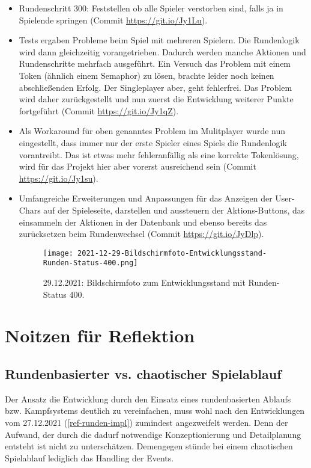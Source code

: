 \begin{itemize}
    \item Rundenschritt 300: Feststellen ob alle Spieler verstorben sind, falls ja in Spielende springen (Commit \url{https://git.io/Jy1Lu}).
    \item Tests ergaben Probleme beim Spiel mit mehreren Spielern. Die Rundenlogik wird dann gleichzeitig vorangetrieben. Dadurch werden manche Aktionen und Rundenschritte mehrfach ausgeführt. Ein Versuch das Problem mit einem Token (ähnlich einem Semaphor) zu lösen, brachte leider noch keinen abschließenden Erfolg. Der Singleplayer aber, geht fehlerfrei. Das Problem wird daher zurückgestellt und nun zuerst die Entwicklung weiterer Punkte fortgeführt (Commit \url{https://git.io/Jy1qZ}).
    \item Als Workaround für oben genanntes Problem im Mulitplayer wurde nun eingestellt, dass immer nur der erste Spieler eines Spiels die Rundenlogik vorantreibt. Das ist etwas mehr fehleranfällig als eine korrekte Tokenlösung, wird für das Projekt hier aber vorerst ausreichend sein (Commit \url{https://git.io/Jy1su}).
    \item Umfangreiche Erweiterungen und Anpassungen für das Anzeigen der User-Chars auf der Spieleseite, darstellen und aussteuern der Aktions-Buttons, das einsammeln der Aktionen in der Datenbank und ebenso bereits das zurücksetzen beim Rundenwechsel (Commit \url{https://git.io/JyDlp}).

    \begin{figure}[H]
        \centering
        \caption[]{29.12.2021: Bildschirmfoto zum Entwicklungsstand mit Runden-Status 400.}
        \label{fig:2021-12-29-Bildschirmfoto-Entwicklungsstand-Runden-Status-400.png}
        \texttt{[image: 2021-12-29-Bildschirmfoto-Entwicklungsstand-Runden-Status-400.png]}
    \end{figure}

\end{itemize}


\section{Noitzen für Reflektion}

\subsection{Rundenbasierter vs. chaotischer Spielablauf}

Der Ansatz die Entwicklung durch den Einsatz eines rundenbasierten Ablaufs bzw. Kampfsystems deutlich zu vereinfachen, muss wohl nach den Entwicklungen vom 27.12.2021 (\ref{ref-runden-impl}) zumindest angezweifelt werden. Denn der Aufwand, der durch die dadurf notwendige Konzeptionierung und Detailplanung entsteht ist nicht zu unterschätzen. Demengegen stünde bei einem chaotischen Spielablauf lediglich das Handling der Events. 

